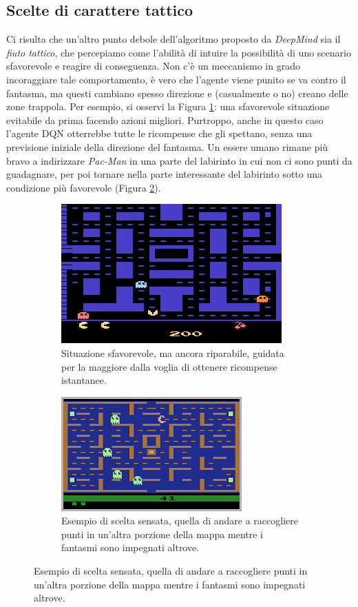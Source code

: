 \documentclass[twoside,twocolumn,10pt]{extarticle}
\theoremstyle{definition}
\begin{document}
	\subsection{Scelte di carattere tattico}
		Ci risulta che un'altro punto debole dell'algoritmo proposto da \textit{DeepMind} sia il \textit{fiuto tattico}, che percepiamo come l'abilità di intuire la possibilità di uno scenario sfavorevole e reagire di conseguenza. Non c'è un meccanismo in grado incoraggiare tale comportamento, è vero che l'agente viene punito se va contro il fantasma, ma questi cambiano spesso direzione e (casualmente o no) creano delle zone trappola. Per esempio, si osservi la Figura \ref{fig:subpacman}: una sfavorevole situazione evitabile da prima facendo azioni migliori. Purtroppo, anche in questo caso l'agente DQN otterrebbe tutte le ricompense che gli spettano, senza una previsione iniziale della direzione del fantasma. Un essere umano rimane più bravo a indirizzare \textit{Pac-Man} in una parte del labirinto in cui non ci sono punti da guadagnare, per poi tornare nella parte interessante del labirinto sotto una condizione più favorevole (Figura \ref{fig:subpacman1}).
		
		\begin{figure}[ht!]
			\centering
			
			\begin{subfigure}[b]{.49\textwidth}
				\includegraphics[scale=1.05]{images/pacman.png}
				\caption{Situazione sfavorevole, ma ancora riparabile, guidata per la maggiore dalla voglia di ottenere ricompense istantanee.}
				\label{fig:subpacman}
			\end{subfigure}

			\begin{subfigure}[b]{.49\textwidth}
				\includegraphics[scale=1.3]{images/pacman1.png}
				\caption{Esempio di scelta sensata, quella di andare a raccogliere punti in un'altra porzione della mappa mentre i fantasmi sono impegnati altrove.}
				\label{fig:subpacman1}
			\end{subfigure}
			
			\label{fig:pacman}
		\end{figure}
	
\end{document}
